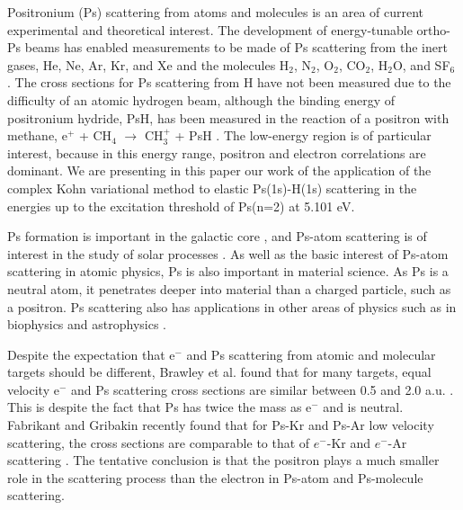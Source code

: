 \documentclass[preprint,showpacs,preprintnumbers,amsmath,amssymb,longbibliography,pra,aps]{revtex4-1}
\begin{document}
Positronium (Ps) scattering from atoms and molecules is an area of current experimental and theoretical interest. The development of energy-tunable ortho-Ps beams \cite{Brown1985,Laricchia1987,Zafar1996,Garner1996,Laricchia2008} has enabled measurements to be made of Ps scattering from the inert gases, He, Ne, Ar, Kr, and Xe \cite{Garner1996,Garner2000,Armitage2002,Laricchia2004,Armitage2006,Laricchia2008,Engbrecht2008,Brawley2010a} and the molecules H$_2$, N$_2$, O$_2$, CO$_2$, H$_2$O, and SF$_6$ \cite{Garner1996,Garner1998,Garner2000,Laricchia2004,Armitage2006,Beale2006,Brawley2010a}. The cross sections for Ps scattering from H have not been measured due to the difficulty
of an atomic hydrogen beam, although the binding energy of positronium hydride, PsH, has been measured in the reaction of a positron with methane, e$^+$ + CH$_4$ $\to$ CH$_3^+$ + PsH \cite{Schrader1992}.
The low-energy region is of particular interest, because in this energy range, positron and electron correlations are dominant. We are presenting in this paper our work of the application of the complex Kohn variational method to elastic Ps(1s)-H(1s) scattering in the energies up to the excitation threshold of Ps(n=2) at 5.101 eV.

Ps formation is important in the galactic core \cite{Kinzer1996}, and Ps-atom scattering is of interest in the study of solar processes \cite{Crannell1976}.
As well as the basic interest of Ps-atom scattering in atomic physics,
Ps is also important in material science.
As Ps is a neutral atom, it penetrates deeper into material than a charged particle,
such as a positron.
Ps scattering also has applications
in other areas of physics such as in biophysics and astrophysics \cite{Laricchia2012}.

Despite the expectation that e$^-$ and Ps scattering from atomic and molecular targets should be different, Brawley et al. found that for many targets, equal velocity e$^-$ and Ps scattering cross sections are similar between 0.5 and 2.0 a.u. \cite{Brawley2010a,Brawley2010}. This is despite the fact that Ps has twice the mass as e$^-$ and is neutral. Fabrikant and Gribakin recently found that for Ps-Kr and Ps-Ar low velocity scattering, the cross sections are comparable to that of $e^-$-Kr and $e^-$-Ar scattering \cite{Fabrikant2014,Fabrikant2014a}. The tentative conclusion is that the positron plays a much smaller role in the scattering process than the electron in Ps-atom and Ps-molecule scattering.
\end{document}

